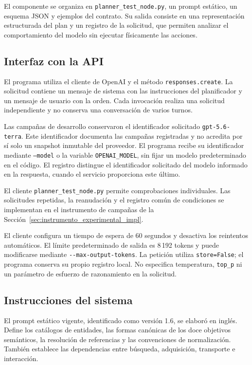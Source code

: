 El componente se organiza en \texttt{planner\_\allowbreak test\_\allowbreak node.\allowbreak py}, un
prompt estático, un esquema JSON y ejemplos del contrato. Su salida
consiste en una representación estructurada del plan y un registro
de la solicitud, que permiten analizar el comportamiento del modelo
sin ejecutar físicamente las acciones.

\subsection{Interfaz con la API}

El programa utiliza el cliente de OpenAI y el método
\texttt{responses.\allowbreak create}. La solicitud contiene un mensaje de
sistema con las instrucciones del planificador y un mensaje de
usuario con la orden. Cada invocación realiza una solicitud
independiente y no conserva una conversación de varios turnos.

Las campañas de desarrollo conservaron el identificador solicitado
\texttt{gpt-5.6-terra}. Este identificador documenta las campañas registradas y no acredita
por sí solo un snapshot inmutable del proveedor. El programa recibe su identificador mediante
\texttt{--model} o la variable \texttt{OPENAI\_MODEL}, sin fijar un
modelo predeterminado en el código. El registro distingue el
identificador solicitado del modelo informado en la respuesta,
cuando el servicio proporciona este último.

El cliente \texttt{planner\_\allowbreak test\_\allowbreak node.\allowbreak py} permite comprobaciones
individuales. Las solicitudes repetidas, la reanudación y el registro
común de condiciones se implementan en el instrumento de campañas de la
Sección~\ref{sec:instrumento_experimental_impl}.

El cliente configura un tiempo de espera de 60 segundos y desactiva
los reintentos automáticos. El límite predeterminado de salida es
8\,192 tokens y puede modificarse mediante
\texttt{-\allowbreak -\allowbreak max-\allowbreak output-\allowbreak tokens}. La petición utiliza
\texttt{store=False}; el programa conserva su propio registro local.
No especifica temperatura, \texttt{top\_p} ni un parámetro de esfuerzo
de razonamiento en la solicitud.

\subsection{Instrucciones del sistema}

El prompt estático vigente, identificado como versión 1.6, se elaboró en
inglés. Define los catálogos de entidades, las formas canónicas de
los doce objetivos semánticos, la resolución de referencias y las
convenciones de normalización. También establece las dependencias
entre búsqueda, adquisición, transporte e interacción.

